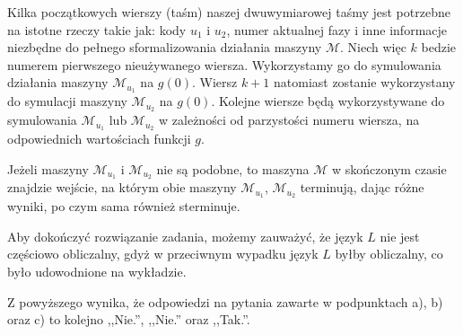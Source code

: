 \documentclass[12pt]{article}
\begin{document}
	\medskip
	
	Kilka początkowych wierszy (taśm) naszej dwuwymiarowej taśmy jest potrzebne
	na istotne rzeczy takie jak: kody \(u_{1}\) i \(u_{2}\), numer aktualnej
	fazy i inne informacje niezbędne do pełnego sformalizowania działania
	maszyny \(\mathcal{M}\). Niech więc \(k\) bedzie numerem pierwszego
	nieużywanego wiersza. Wykorzystamy go do symulowania działania maszyny
	\(\mathcal{M}_{u_{1}}\) na \(g \left( 0 \right)\). Wiersz \(k + 1\)
	natomiast zostanie wykorzystany do symulacji maszyny \(\mathcal{M}_{u_{2}}\)
	na \(g \left( 0 \right)\). Kolejne wiersze będą wykorzystywane do
	symulowania \(\mathcal{M}_{u_{1}}\) lub \(\mathcal{M}_{u_{2}}\) w zależności
	od parzystości numeru wiersza, na odpowiednich wartościach funkcji \(g\).
	
	\medskip
	
	Jeżeli maszyny \(\mathcal{M}_{u_{1}}\) i \(\mathcal{M}_{u_{2}}\) nie są
	podobne, to maszyna \(\mathcal{M}\) w skończonym czasie znajdzie wejście,
	na którym obie maszyny \(\mathcal{M}_{u_{1}}\), \(\mathcal{M}_{u_{2}}\)
	terminują, dając różne wyniki, po czym sama również sterminuje.
	
	\bigskip
	
	Aby dokończyć rozwiązanie zadania, możemy zauważyć, że język \(L\) nie jest
	częściowo obliczalny, gdyż w przeciwnym wypadku język \(L\) byłby
	obliczalny, co było udowodnione na wykładzie.
	
	\bigskip
	
	Z powyższego wynika, że odpowiedzi na pytania zawarte w podpunktach a), b)
	oraz c) to kolejno ,,Nie.'', ,,Nie.'' oraz ,,Tak.''.
\end{document}
